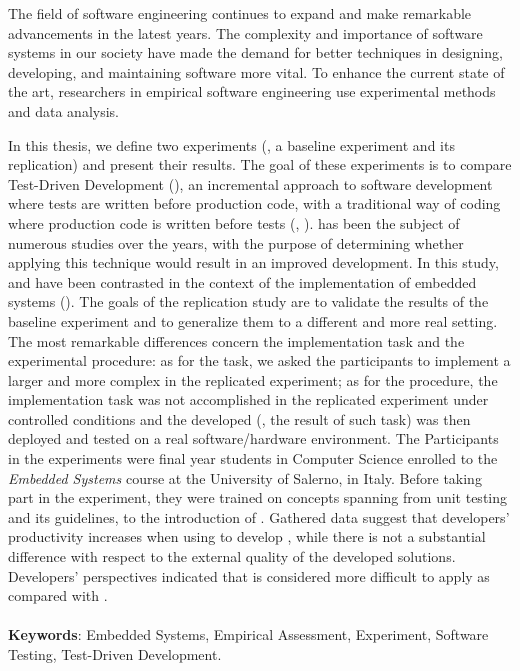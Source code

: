 The field of software engineering continues to expand and make remarkable advancements in the latest years. The complexity and importance of software systems in our society have made the demand for better techniques in designing, developing, and maintaining software more vital. To enhance the current state of the art, researchers in empirical software engineering use experimental methods and data analysis.

In this thesis, we define two experiments (\ie, a baseline experiment and its replication) and present their results. The goal of these experiments is to compare Test-Driven Development (\tdd), an incremental approach to software development where tests are written before production code, with a traditional way of coding where production code is written before tests (\ie, \notdd). \tdd has been the subject of numerous studies over the years, with the purpose of determining whether applying this technique would result in an improved development. In this study, \tdd and \notdd have been contrasted in the context of the implementation of embedded systems (\ess). The goals of the replication study are to validate the results of the baseline experiment and to generalize them to a different and more real setting. The most remarkable differences concern the implementation task and the experimental procedure: as for the task, we asked the participants to implement a larger and more complex \es in the replicated experiment; as for the procedure, the implementation task was not accomplished in the replicated experiment under controlled conditions and the developed \es (\ie, the result of such task) was then deployed and tested on a real software/hardware environment.  
The Participants in the experiments were final year students in Computer Science enrolled to the \textit{Embedded Systems} course at the University of Salerno, in Italy. Before taking part in the experiment, they were trained on concepts spanning from unit testing and its guidelines, to the introduction of \tdd.
Gathered data suggest that developers' productivity increases when using \tdd to develop \ess, while there is not a substantial difference with respect to the external quality of the developed solutions. Developers' perspectives indicated that \tdd is considered more difficult to apply as compared with \notdd.
\\ \ \\
\noindent \textbf{Keywords}: Embedded Systems, Empirical Assessment, Experiment, Software Testing, Test-Driven Development.